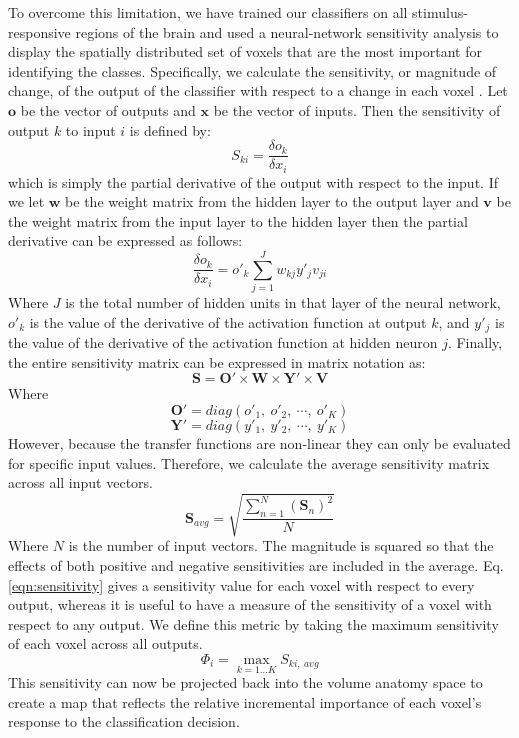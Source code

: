 \documentclass[preprint,5p,authoryear]{elsarticle}
\begin{document}
To overcome this limitation, we have trained our classifiers on all stimulus-responsive regions of the brain and used a neural-network sensitivity analysis to display the spatially distributed set of voxels that are the most important for identifying the classes.
Specifically, we calculate the sensitivity, or magnitude of change, of the output of the classifier with respect to a change in each voxel
 \citep{Zurada1994}.
Let $\mathbf{o}$ be the vector of outputs and $\mathbf{x}$ be the vector of inputs.
Then the sensitivity of output $k$ to input $i$ is defined by:
\begin{equation}
S_{ki} = \frac{\delta o_{k}}{\delta x_{i}}
\end{equation}
which is simply the partial derivative of the output with respect to the input.
If we let $\mathbf{w}$ be the weight matrix from the hidden layer to the output layer and $\mathbf{v}$ be the weight matrix from the input layer to the hidden layer then the partial derivative can be expressed as follows:
\begin{equation}
\frac{\delta o_{k}}{\delta x_{i}} = o'_{k} \sum^{J}_{j=1}{w_{kj}y'_{j}v_{ji}}
\end{equation}
Where $J$ is the total number of hidden units in that layer of the neural network,  $o'_{k}$ is the value of the derivative of the activation function at output $k$, and $y'_{j}$ is the value of the derivative of the activation function at hidden neuron $j$.
Finally, the entire sensitivity matrix can be expressed in matrix notation as:
\begin{equation}
\mathbf{S} = \mathbf{O}' \times \mathbf{W} \times \mathbf{Y}' \times \mathbf{V}
\end{equation}
Where
\begin{equation}
\mathbf{O}' = diag(o'_{1},~o'_{2},~\cdots,~o'_{K})
\end{equation}
\begin{equation}
\mathbf{Y}' = diag(y'_{1},~y'_{2},~\cdots,~y'_{K})
\end{equation}
However, because the transfer functions are non-linear they can only be evaluated for specific input values.
Therefore, we calculate the average sensitivity matrix across all input vectors.
\begin{equation}
\mathbf{S}_{avg} = \sqrt{ \frac{ \sum_{n = 1}^{N}{ \left( \mathbf{S}_{n}\right)^{2} } }{N} }
\label{eqn:sensitivity}
\end{equation}
Where $N$ is the number of input vectors.
The magnitude is squared so that the effects of both positive and negative sensitivities are included in the average.
Eq. \ref{eqn:sensitivity} gives a sensitivity value for each voxel with respect to every output, whereas it is useful to have a measure of the sensitivity of a voxel with respect to any output.
We define this metric by taking the maximum sensitivity of each voxel across all outputs.
\begin{equation}
\Phi_{i} = \max_{k=1 \dots K}{S_{ki,~avg}}
\end{equation}
This sensitivity can now be projected back into the volume anatomy space to create a  map that reflects the relative incremental importance of each voxel's response to the classification decision.
\end{document}
